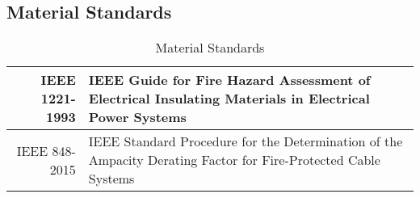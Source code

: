 \subsection{Material Standards}
\bgroup
\def\arraystretch{1.5}
\begin{table}[H]
\centering
\begin{tabular}{ | p{4cm} | p{12cm}| }
\hline
\multicolumn{1}{|r|}{IEEE 1221-1993} & IEEE Guide for Fire Hazard Assessment of Electrical Insulating Materials in Electrical Power Systems \cite{R20}\\ 
\hline
\multicolumn{1}{|r|}{IEEE 848-2015} & IEEE Standard Procedure for the Determination of the Ampacity Derating Factor for Fire-Protected Cable Systems \cite{R21}\\ 
\hline
\end{tabular}
\caption{Material Standards}
\end{table}	


%